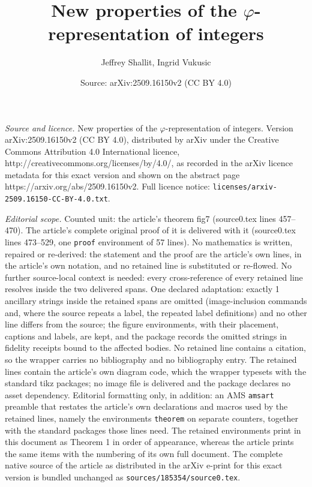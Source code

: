 \documentclass[10pt,a4paper]{amsart}
\title{New properties of the $\varphi$-representation of integers}
\author{Jeffrey Shallit, Ingrid Vukusic}
\date{Source: arXiv:2509.16150v2 (CC BY 4.0)}
\begin{document}
\maketitle

\noindent\emph{Source and licence.} New properties of the $\varphi$-representation of integers. Version arXiv:2509.16150v2 (CC BY 4.0), distributed by arXiv under the Creative Commons Attribution 4.0 International licence, http://creativecommons.org/licenses/by/4.0/, as recorded in the arXiv licence metadata for this exact version and shown on the abstract page https://arxiv.org/abs/2509.16150v2. Full licence notice: \texttt{licenses/arxiv-2509.16150-CC-BY-4.0.txt}.\par\smallskip

\noindent\textit{Editorial scope.} Counted unit: the article's theorem fig7 (source0.tex lines 457--470). The article's complete original proof of it is delivered with it (source0.tex lines 473--529, one \texttt{proof} environment of 57 lines). No mathematics is written, repaired or re-derived: the statement and the proof are the article's own lines, in the article's own notation, and no retained line is substituted or re-flowed.  No further source-local context is needed: every cross-reference of every retained line resolves inside the two delivered spans.  One declared adaptation: exactly 1 ancillary strings inside the retained spans are omitted (image-inclusion commands and, where the source repeats a label, the repeated label definitions) and no other line differs from the source; the figure environments, with their placement, captions and labels, are kept, and the package records the omitted strings in fidelity receipts bound to the affected bodies.  No retained line contains a citation, so the wrapper carries no bibliography and no bibliography entry.  The retained lines contain the article's own diagram code, which the wrapper typesets with the standard tikz packages; no image file is delivered and the package declares no asset dependency.  Editorial formatting only, in addition: an AMS \texttt{amsart} preamble that restates the article's own declarations and macros used by the retained lines, namely the environments \texttt{theorem} on separate counters, together with the standard packages those lines need.  The retained environments print in this document as Theorem 1 in order of appearance, whereas the article prints the same items with the numbering of its own full document.  The complete native source of the article as distributed in the arXiv e-print for this exact version is bundled unchanged as \texttt{sources/185354/source0.tex}.
\end{document}
